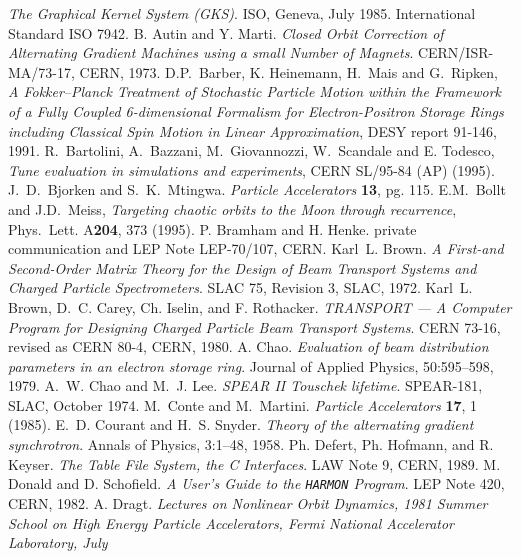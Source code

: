 \begin{thebibliography}{10}
{\sl The Graphical Kernel System (GKS)}.
ISO, Geneva, July 1985.
International Standard ISO 7942.
B. Autin and Y. Marti.
{\sl Closed Orbit Correction of Alternating Gradient Machines
  using a small Number of Magnets}.
CERN/ISR-MA/73-17, CERN, 1973.
 D.P.~Barber, K. Heinemann, H.~Mais and G.~Ripken,
  {\sl A Fokker--Planck Treatment of Stochastic Particle Motion within
    the Framework of a Fully Coupled 6-dimensional Formalism for
    Electron-Positron Storage Rings including Classical Spin Motion in
    Linear Approximation}, DESY report 91-146, 1991.
 R.~Bartolini, A.~Bazzani, M.~Giovannozzi,
  W.~Scandale and E. Todesco, {\sl Tune evaluation in simulations and
    experiments}, CERN SL/95-84 (AP) (1995).
J.~D.~Bjorken and S.~K.~Mtingwa.
{\sl Particle Accelerators} {\bf 13}, pg. 115.
 E.M.~Bollt and J.D.~Meiss, {\sl Targeting chaotic
    orbits to the Moon through recurrence}, Phys.~Lett. A{\bf 204},
  373 (1995).
P. Bramham and H. Henke.
private communication and LEP Note LEP-70/107, CERN.
Karl~L. Brown.
{\sl A First-and Second-Order Matrix Theory for the Design
  of Beam Transport Systems and Charged Particle Spectrometers}.
SLAC 75, Revision 3, SLAC, 1972.
Karl~L. Brown, D.~C. Carey, Ch. Iselin, and F. Rothacker.
{\sl TRANSPORT --- A Computer Program for Designing Charged
  Particle Beam Transport Systems}.
CERN 73-16, revised as CERN 80-4, CERN, 1980.
A. Chao.
{\sl Evaluation of beam distribution parameters in an electron
  storage ring}.
Journal of Applied Physics, 50:595--598, 1979.
A.~W. Chao and M.~J. Lee.
{\sl SPEAR II Touschek lifetime}.
SPEAR-181, SLAC, October 1974.
M.~Conte and M.~Martini.
{\sl Particle Accelerators} {\bf 17}, 1 (1985).
E.~D. Courant and H.~S. Snyder.
{\sl Theory of the alternating gradient synchrotron}.
Annals of Physics, 3:1--48, 1958.
Ph. Defert, Ph. Hofmann, and R. Keyser.
{\sl The Table File System, the C Interfaces}.
LAW Note 9, CERN, 1989.
M. Donald and D. Schofield.
{\sl A User's Guide to the {\tt HARMON} Program}.
LEP Note 420, CERN, 1982.
A. Dragt.
{\sl Lectures on Nonlinear Orbit Dynamics, 1981 Summer School on High
  Energy Particle Accelerators, Fermi National Accelerator Laboratory, July
}
\end{thebibliography}
